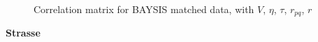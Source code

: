 \begin{figure}[!ht]
	\centering
	\caption{Correlation matrix for BAYSIS matched data, with $V$, $\eta$, $\tau$, $r_{pq}$, $r$}
	\label{img:correlation_matrix_matched_cramers}
\end{figure}

\pagebreak


\Large
\centerline{\textbf{Strasse}}
\normalsize

